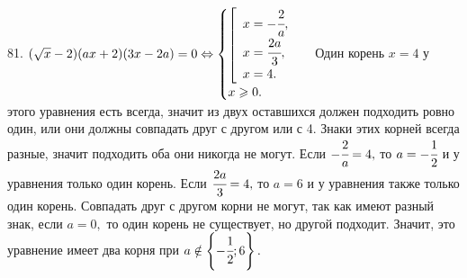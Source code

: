 81. $(\sqrt{x}-2)(ax+2)(3x-2a)=0\Leftrightarrow\begin{cases} \left[\begin{array}{l}x=-\cfrac{2}{a},\\ x=\cfrac{2a}{3},\\ x=4.\end{array}\right.\\ x\geqslant0.\end{cases}$ Один корень $x=4$ у этого уравнения есть всегда, значит из двух оставшихся должен подходить ровно один, или они должны совпадать друг с другом или с 4. Знаки этих корней всегда разные, значит подходить оба они никогда не могут. Если $-\cfrac{2}{a}=4,$ то $a=-\cfrac{1}{2}$ и у уравнения только один корень. Если $\cfrac{2a}{3}=4,$ то $a=6$ и у уравнения также только один корень. Совпадать друг с другом корни не могут, так как имеют разный знак, если $a=0,$ то один корень не существует, но другой подходит. Значит, это уравнение имеет два корня при $a\notin\left\{-\cfrac{1}{2};6\right\}.$\\
